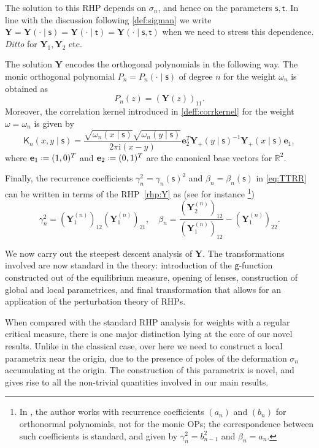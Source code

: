 \documentclass[reqno,a4paper,11pt]{amsart}
\newcommand{\R}{\mathbb{R}}
\newcommand{\ii}{\mathrm{i}}
\newcommand*{\deff}{\mathrel{\vcenter{\baselineskip0.5ex \lineskiplimit0pt
                     \hbox{\scriptsize.}\hbox{\scriptsize.}}}%
                     =}
\renewcommand{\bm}{\mathbf}
\newcommand{\msf}{\mathsf}
\newcommand{\tad}{\msf t}
\newcommand{\sad}{\msf s}
\theoremstyle{definition}
\theoremstyle{remark}
\numberwithin{equation}{section}
\begin{document}
The solution to this RHP depends on $\sigma_n$, and hence on the parameters $\sad,\tad$. In line with the discussion following \eqref{def:sigman} we write $\bm Y=\bm Y(\cdot\mid \sad)=\bm Y(\cdot\mid \tad)=\bm Y(\cdot\mid \sad,\tad)$ when we need to stress this dependence. {\it Ditto} for $\bm Y_1,\bm Y_2$ etc. 

The solution $\bm Y$  encodes the orthogonal polynomials in the following way. The monic orthogonal polynomial $P_n=P_n(\cdot\mid \sad)$ of degree $n$ for the weight $\omega_n$ is obtained as
%
$$
P_n(z)=(\bm Y(z))_{11}.
$$
%
Moreover, the correlation kernel introduced in \eqref{deff:corrkernel} for the weight $\omega=\omega_n$ is given by 
%
\begin{equation}\label{eq:relKnRHPY}
\msf K_n(x,y\mid \sad)= \frac{\sqrt{\omega_n(x\mid \sad)}{\sqrt{\omega_n(y\mid \sad )}}}{2\pi \ii (x-y)}\bm e_2^T \bm Y_+(y\mid \sad)^{-1}\bm Y_+(x\mid \sad)\bm e_1, 
\end{equation}
%
where $\bm e_1\deff (1,0)^T$ and $\bm e_2\deff (0,1)^T$ are the canonical base vectors for $\R^2$. 

Finally, the recurrence coefficients $\gamma_n^2=\gamma_n(\sad)^2$ and $\beta_n=\beta_n(\sad)$ in \eqref{eq:TTRR} can be written in terms of the RHP~\ref{rhp:Y} as (see for instance \cite[(3.13) and (3.34)]{deift_book}\footnote{In \cite{deift_book}, the author works with recurrence coefficients $(a_n)$ and $(b_n)$ for orthonormal polynomials, not for the monic OPs; the correspondence between such coefficients is standard, and given by $\gamma_n^2=b_{n-1}^2$ and $\beta_n=a_n$.})
    \begin{equation}\label{eq:rec_coef_from_RHP}
        \gamma_n^2 = \left( \bm Y_1^{(n)}\right)_{12} \left( \bm Y_1^{(n)}\right)_{21}, 
        \quad \beta_n = \frac{\left( \bm Y_2^{(n)}\right)_{12}}{\left(\bm Y_{1}^{(n)} \right)_{12}} - \left( \bm Y_1^{(n)}\right)_{22}.
    \end{equation}

We now carry out the steepest descent analysis of $\bm Y$. The transformations involved are now standard in the theory: introduction of the $\msf g$-function constructed out of the equilibrium measure, opening of lenses, construction of global and local parametrices, and final transformation that allows for an application of the perturbation theory of RHPs. 

When compared with the standard RHP analysis for weights with a regular critical measure, there is one major distinction lying at the core of our novel results. Unlike in the classical case, over here we need to construct a local parametrix near the origin, due to the presence of poles of the deformation $\sigma_n$ accumulating at the origin. The construction of this parametrix is novel, and gives rise to all the non-trivial quantities involved in our main results.
\end{document}
